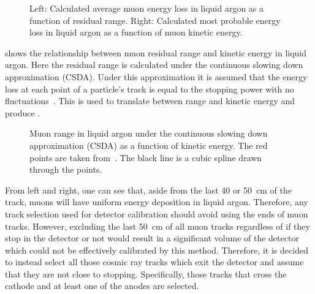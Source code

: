 \begin{figure}[h]
	\begin{minipage}[t]{.5\linewidth}
		\begin{adjustbox}{max totalsize=\linewidth, center}
			
		\end{adjustbox}
	\end{minipage}
	\hfill
	\begin{minipage}[t]{.5\linewidth}
		\begin{adjustbox}{max totalsize=\linewidth, center}
			
		\end{adjustbox}
	\end{minipage}
	\caption[Muon energy deposition as a function of range and kinetic energy]{Left: Calculated average muon energy loss in liquid argon as a function of residual range. Right: Calculated most probable energy loss in liquid argon as a function of muon kinetic energy.}
	\label{fig:muonEDep}
\end{figure}

 shows the relationship between muon residual range and kinetic energy in liquid argon. 
Here the residual range is calculated under the continuous slowing down approximation (CSDA).
Under this approximation it is assumed that the energy loss at each point of a particle's track is equal to the stopping power with no fluctuations~\cite{protonRangeTables}.
This is used to translate between range and kinetic energy and produce .

\begin{figure}[h]
	\begin{adjustbox}{max totalsize=.5\linewidth, center}
		
	\end{adjustbox}
	\caption[Muon range in liquid argon as a function of kinetic energy]{Muon range in liquid argon under the continuous slowing down approximation (CSDA) as a function of kinetic energy. The red points are taken from~\cite{muonCSDA}. The black line is a cubic spline drawn through the points.}
	\label{fig:keVsRange}
\end{figure}

From  left and right, one can see that, aside from the last 40 or \SI{50}{\cm} of the track, muons will have uniform energy deposition in liquid argon.
Therefore, any track selection used for detector calibration should avoid using the ends of muon tracks.
However, excluding the last \SI{50}{\cm} of all muon tracks regardless of if they stop in the detector or not would result in a significant volume of the detector which could not be effectively calibrated by this method.
Therefore, it is decided to instead select all those cosmic ray tracks which exit the detector and assume that they are not close to stopping.
Specifically, those tracks that cross the cathode and at least one of the anodes are selected.

